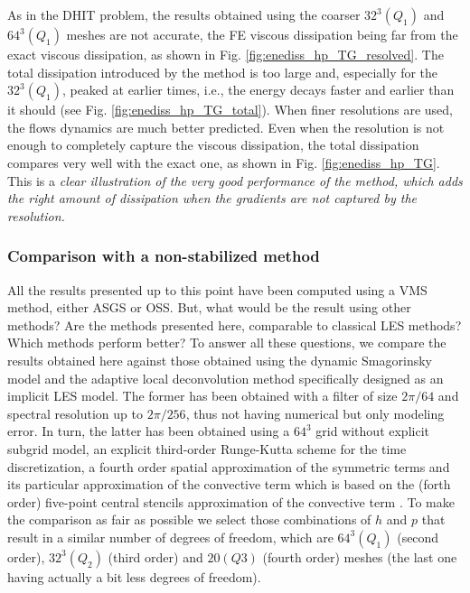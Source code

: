 As in the DHIT problem, the results obtained using the coarser $32^3 (Q_1)$ and $64^3 (Q_1)$ meshes are not accurate, the FE viscous dissipation being far from the exact viscous dissipation, as shown in Fig. \ref{fig:enediss_hp_TG_resolved}. The total dissipation introduced by the method is too large and, especially for the $32^3 (Q_1)$, peaked at earlier times, i.e., the energy decays faster and earlier than it should (see Fig. \ref{fig:enediss_hp_TG_total}). When finer resolutions are used, the flows dynamics are much better predicted. Even when the resolution is not enough to completely capture the viscous dissipation, the total dissipation compares very well with the exact one, as shown in  Fig. \ref{fig:enediss_hp_TG}. This is a \emph{clear illustration of the very good performance of the method, which adds the right amount of dissipation when the gradients are not captured by the resolution.}

\subsubsection{Comparison with a non-stabilized method}

All the results presented up to this point have been computed using a VMS method, either ASGS or OSS. But, what would be the result using other methods? Are the methods presented here, comparable to classical LES methods? Which methods perform better? To answer all these questions, we compare the results obtained here against those obtained using the dynamic Smagorinsky model \cite{fauconnier_construction_2009} and the adaptive local deconvolution method \cite{hickel_adaptive_2006} specifically designed as an implicit LES model. The former has been obtained with a filter of size $2 \pi / 64$ and spectral resolution up to $2 \pi / 256$, thus not having numerical but only modeling error. In turn, the latter has been obtained using a $64^3$ grid without explicit subgrid model, an explicit third-order Runge-Kutta scheme for the time discretization, a fourth order spatial approximation of the symmetric terms and its particular approximation of the convective term which is based on the (forth order) five-point central stencils approximation of the convective term \cite{hickel_adaptive_2006}. To make the comparison as fair as possible we select those combinations of $h$ and $p$ that result in a similar number of degrees of freedom, which are $64^3 (Q_1)$ (second order), $32^3 (Q_2)$ (third order) and $20 (Q3)$ (fourth order) meshes (the last one having actually a bit less degrees of freedom).

